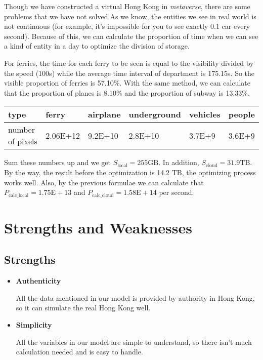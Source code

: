 \documentclass[12pt]{article}
\theoremstyle{definition}
\theoremstyle{remark}
\numberwithin{equation}{section}
\begin{document}
		Though we have constructed a virtual Hong Kong in \textit{metaverse}, there are some problems that we have not solved.As we know, the entities we see in real world is not continuous (for example, it’s impossible for you to see exactly 0.1 car every second). Because of this, we can calculate the proportion of time when we can see a kind of entity in a day to optimize the division of storage.
		
		For ferries, the time for each ferry to be seen is equal to the visibility divided by the speed (100s) while the average time interval of department is 175.15s. So the visible proportion of ferries is 57.10\%. With the same method, we can calculate that the proportion of planes is 8.10\% and the proportion of subway is 13.33\%.
		
		\begin{tabular}{|l|l|l|l|l|l|}
			\hline
			type&ferry&airplane&underground&vehicles&people\\
			\hline
			number of pixels&2.06E+12&9.2E+10&2.8E+10&3.7E+9&3.6E+9\\
			\hline
		\end{tabular}
		
		Sum these numbers up and we get $S_\mathrm{local}=255\mathrm{GB}$. In addition, $S_\mathrm{cloud}=31.9\mathrm{TB}$. By the way, the result before the optimization is 14.2 TB, the optimizing process works well. Also, by the previous formulae we can calculate that $P_\mathrm{calc\_local}=1.75\mathrm{E}+13$ and $P_\mathrm{calc\_cloud}=1.58\mathrm{E}+14$ per second.
	
	\section{Strengths and Weaknesses}
	\subsection*{Strengths}
		\begin{itemize}
			\item \textbf{Authenticity}
			
			All the data mentioned in our model is provided by authority in Hong Kong, so it can simulate the real Hong Kong well.
			\item \textbf{Simplicity}
			
			All the variables in our model are simple to understand, so there isn't much calculation needed and is easy to handle.
		\end{itemize}
\end{document}
